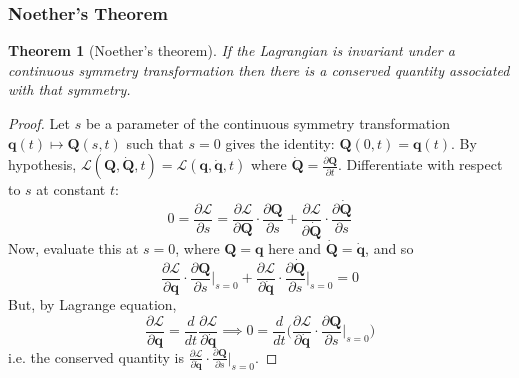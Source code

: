 \documentclass[a4paper]{article}
\newtheorem{thm}{Theorem}[section]
\theoremstyle{new}
\begin{document}
\subsubsection{Noether's Theorem}
\begin{thm}[Noether's theorem]
If the Lagrangian is invariant under a continuous symmetry transformation then there is a conserved quantity associated with that symmetry.
\end{thm}
\begin{proof}
Let $s$ be a parameter of the continuous symmetry transformation $\mathbf{q}(t)\mapsto\mathbf{Q}(s,t)$ such that $s=0$ gives the identity: $\mathbf{Q}(0,t)=\mathbf{q}(t)$. By hypothesis, $\mathcal{L}(\mathbf{Q},\mathbf{\dot{Q}},t)=\mathcal{L}(\mathbf{q},\mathbf{\dot{q}},t)$ where $\mathbf{\dot{Q}}=\frac{\partial\mathbf{Q}}{\partial t}$. Differentiate with respect to $s$ at constant $t$:
$$0=\frac{\partial\mathcal{L}}{\partial s}=\frac{\partial\mathcal{L}}{\partial\mathbf{Q}}\cdot\frac{\partial\mathbf{Q}}{\partial s}+\frac{\partial\mathcal{L}}{\partial\mathbf{\dot{Q}}}\cdot\frac{\partial\mathbf{\dot{Q}}}{\partial s}$$
Now, evaluate this at $s=0$, where $\mathbf{Q}=\mathbf{q}$ here and $\mathbf{\dot{Q}}=\mathbf{\dot{q}}$, and so
$$\frac{\partial\mathcal{L}}{\partial\mathbf{q}}\cdot\frac{\partial\mathbf{Q}}{\partial s}\bigg|_{s=0}+\frac{\partial\mathcal{L}}{\partial\mathbf{\dot{q}}}\cdot\frac{\partial\mathbf{\dot{Q}}}{\partial s}\bigg|_{s=0}=0$$
But, by Lagrange equation,
$$\frac{\partial\mathcal{L}}{\partial\mathbf{q}}=\frac{d}{dt}\frac{\partial\mathcal{L}}{\partial\mathbf{\dot{q}}}\implies0=\frac{d}{dt}\bigg(\frac{\partial\mathcal{L}}{\partial\mathbf{\dot{q}}}\cdot\frac{\partial\mathbf{Q}}{\partial s}\bigg|_{s=0}\bigg)$$
i.e. the conserved quantity is $\frac{\partial\mathcal{L}}{\partial\mathbf{\dot{q}}}\cdot\frac{\partial\mathbf{Q}}{\partial s}|_{s=0}$.
\end{proof}
\end{document}
